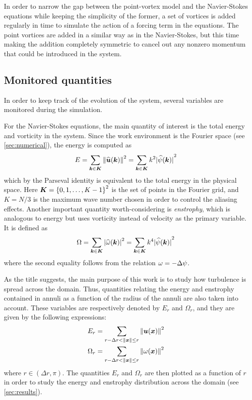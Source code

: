 \documentclass[../main.tex]{subfiles}
\begin{document}
In order to narrow the gap between the point-vortex model and the Navier-Stokes equations while keeping the simplicity of the former, a set of vortices is added regularly in time to simulate the action of a forcing term in the equations. The point vortices are added in a similar way as in the Navier-Stokes, but this time making the addition completely symmetric to cancel out any nonzero momentum that could be introduced in the system.

\subsection{Monitored quantities}
In order to keep track of the evolution of the system, several variables are monitored during the simulation.

For the Navier-Stokes equations, the main quantity of interest is the total energy and vorticity in the system. Since the work environment is the Fourier space (see \cref{sec:numerical}), the energy is computed as
\begin{equation}
	E = \sum_{\boldsymbol{k}\in\boldsymbol{K}} \left\|\widehat{\boldsymbol{u}}(\boldsymbol{k})\right\|^2 = \sum_{\boldsymbol{k}\in\boldsymbol{K}} k^2 {|\widehat{\psi}(\boldsymbol{k})|}^2
\end{equation}
which by the Parseval identity is equivalent to the total energy in the physical space. Here $\boldsymbol{K} = {\{0,1,\ldots,K-1\}}^2$ is the set of points in the Fourier grid, and $K=N/3$ is the maximum wave number chosen in order to control the aliasing effects. Another important quantity worth-considering is \emph{enstrophy}, which is analogous to energy but uses vorticity instead of velocity as the primary variable. It is defined as
\begin{equation}
	\Omega = \sum_{\boldsymbol{k}\in\boldsymbol{K}} {|\widehat{\omega}(\boldsymbol{k})|}^2 = \sum_{\boldsymbol{k}\in\boldsymbol{K}} k^4 {|\widehat{\psi}(\boldsymbol{k})|}^2
\end{equation}
where the second equality follows from the relation $\omega = -\Delta \psi$.

As the title suggests, the main purpose of this work is to study how turbulence is spread across the domain. Thus, quantities relating the energy and enstrophy contained in annuli as a function of the radius of the annuli are also taken into account. These variables are respectively denoted by $E_r$ and $\Omega_r$, and they are given by the following expressions:
\begin{align}
	E_r      & = \sum_{r-\Delta r<\left\|\boldsymbol{x}\right\|\leq r} \left\|{\boldsymbol{u}}(\boldsymbol{x})\right\|^2   \\
	\Omega_r & = \sum_{r-\Delta r<\left\|\boldsymbol{x}\right\|\leq r} \left\|{{\omega}}(\boldsymbol{x})\right\|^2
\end{align}
where $r\in (\Delta r, \pi)$. The quantities $E_r$ and $\Omega_r$ are then plotted as a function of $r$ in order to study the energy and enstrophy distribution across the domain (see \cref{sec:results}).
\end{document}
